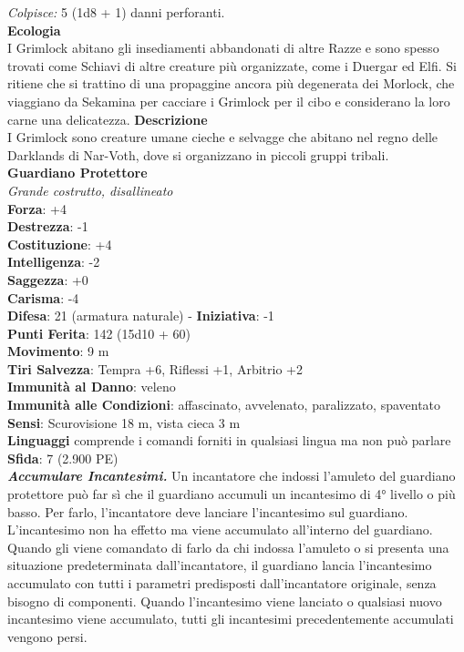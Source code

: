 \begin{multicols}{2}
\emph{Colpisce:} 5 (1d8 + 1) danni perforanti.\\
\textbf{Ecologia}\\
I Grimlock abitano gli insediamenti abbandonati di altre Razze e sono spesso trovati come Schiavi di altre creature più organizzate, come i Duergar ed Elfi. Si ritiene che si trattino di una propaggine ancora più degenerata dei Morlock, che viaggiano da Sekamina per cacciare i Grimlock per il cibo e considerano la loro carne una delicatezza.
\textbf{Descrizione}\\
I Grimlock sono creature umane cieche e selvagge che abitano nel regno delle Darklands di Nar-Voth, dove si organizzano in piccoli gruppi tribali.\\

\medskip\textbf{Guardiano Protettore}\\
\emph{Grande costrutto, disallineato}\\
\textbf{Forza}: +4\\
\textbf{Destrezza}: -1\\
\textbf{Costituzione}: +4\\
\textbf{Intelligenza}: -2\\
\textbf{Saggezza}: +0\\
\textbf{Carisma}: -4\\
\textbf{Difesa}: 21 (armatura naturale) - \textbf{Iniziativa}: -1\\
\textbf{Punti Ferita}: 142 (15d10 + 60)\\
\textbf{Movimento}: 9 m\\
\textbf{Tiri Salvezza}: Tempra +6, Riflessi +1, Arbitrio +2\\
\textbf{Immunità al Danno}: veleno\\
\textbf{Immunità alle Condizioni}: affascinato, avvelenato, paralizzato, spaventato\\
\textbf{Sensi}: Scurovisione 18 m, vista cieca 3 m \\
\textbf{Linguaggi} comprende i comandi forniti in qualsiasi lingua ma non può parlare\\
\textbf{Sfida}: 7 (2.900 PE)\smallskip\\
\emph{\textbf{Accumulare Incantesimi.}} Un incantatore che indossi l'amuleto del guardiano protettore può far sì che il guardiano accumuli un incantesimo di 4° livello o più basso. Per farlo, l'incantatore deve lanciare l'incantesimo sul guardiano. L'incantesimo non ha effetto ma viene accumulato all'interno del guardiano. Quando gli viene comandato di farlo da chi indossa l'amuleto o si presenta una situazione predeterminata dall'incantatore, il guardiano lancia l'incantesimo accumulato con tutti i parametri predisposti dall'incantatore originale, senza bisogno di componenti. Quando l'incantesimo viene lanciato o qualsiasi nuovo incantesimo viene accumulato, tutti gli incantesimi precedentemente accumulati vengono persi.\\

\end{multicols}
